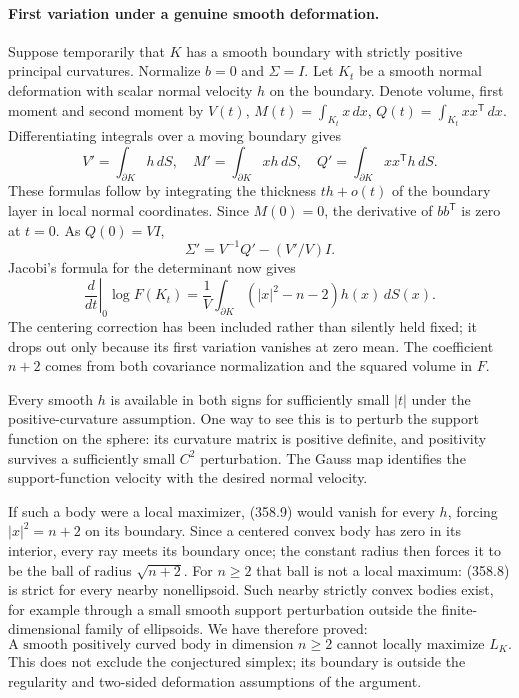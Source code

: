 \documentclass[11pt]{article}
\begin{document}
\paragraph{First variation under a genuine smooth deformation.}
Suppose temporarily that $K$ has a smooth boundary with strictly
positive principal curvatures. Normalize $b=0$ and $\Sigma=I$.
Let $K_t$ be a smooth normal deformation with scalar normal velocity
$h$ on the boundary. Denote volume, first moment and second moment by
$V(t)$, $M(t)=\int_{K_t}x\,dx$, $Q(t)=\int_{K_t}xx^{\mathsf T}\,dx$.
Differentiating integrals over a moving boundary gives
\[
 V'=\int_{\partial K}h\,dS,\quad
 M'=\int_{\partial K}xh\,dS,\quad
 Q'=\int_{\partial K}xx^{\mathsf T}h\,dS.
\]
These formulas follow by integrating the thickness $th+o(t)$ of the
boundary layer in local normal coordinates. Since $M(0)=0$, the
derivative of $bb^{\mathsf T}$ is zero at $t=0$. As $Q(0)=VI$,
\[
 \Sigma'=V^{-1}Q'-(V'/V)I.
\]
Jacobi's formula for the determinant now gives
\[
 \left.\frac{d}{dt}\right|_{0}\log F(K_t)
 =\frac1V\int_{\partial K}(|x|^2-n-2)h(x)\,dS(x).
 \tag{358.9}
\]
The centering correction has been included rather than silently held
fixed; it drops out only because its first variation vanishes at
zero mean. The coefficient $n+2$ comes from both covariance
normalization and the squared volume in $F$.

Every smooth $h$ is available in both signs for sufficiently small
$|t|$ under the positive-curvature assumption. One way to see this
is to perturb the support function on the sphere: its curvature
matrix is positive definite, and positivity survives a sufficiently
small $C^2$ perturbation. The Gauss map identifies the support-function
velocity with the desired normal velocity.

If such a body were a local maximizer, (358.9) would vanish for every
$h$, forcing $|x|^2=n+2$ on its boundary. Since a centered convex body
has zero in its interior, every ray meets its boundary once; the
constant radius then forces it to be the ball of radius $\sqrt{n+2}$.
For $n\geq2$ that ball is not a local maximum: (358.8) is strict for
every nearby nonellipsoid. Such nearby strictly convex bodies exist,
for example through a small smooth support perturbation outside the
finite-dimensional family of ellipsoids. We have therefore proved:
\[
 \text{A smooth positively curved body in dimension }n\geq2
 \text{ cannot locally maximize }L_K.
 \tag{358.10}
\]
This does not exclude the conjectured simplex; its boundary is outside
the regularity and two-sided deformation assumptions of the argument.
\end{document}
